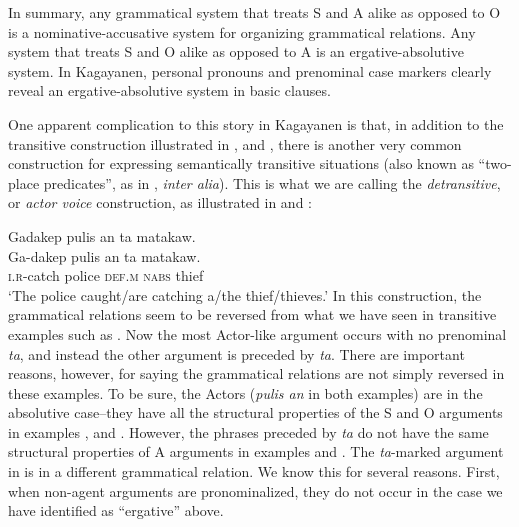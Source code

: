 In summary, any grammatical system that treats S and A alike as opposed to O is a nominative-accusative system for organizing grammatical relations. Any system that treats S and O alike as opposed to A is an ergative-absolutive system. In Kagayanen, personal pronouns and prenominal case markers clearly reveal an ergative-absolutive system in basic clauses.

One apparent complication to this story in Kagayanen is that, in addition to the transitive construction illustrated in ,  and , there is another very common construction for expressing semantically transitive situations (also known as “two-place predicates”, as in \citealt{polinsky2013b}, \textit{inter alia}). This is what we are calling the \textit{detransitive}, or \textit{actor voice} construction, as illustrated in  and :

\ea
\label{bkm:Ref482789597} \label{ex:gadakeppulisantamatakaw}
    Gadakep pulis an ta matakaw. \\\smallskip
\gll Ga-dakep pulis an ta matakaw. \\
    \textsc{i.r}-catch police \textsc{def.m} \textsc{nabs} thief \\
    \glt ‘The police caught/are catching a/the thief/thieves.’
\z
In this construction, the grammatical relations seem to be reversed from what we have seen in transitive examples such as . Now the most Actor-like argument occurs with no prenominal \textit{ta}, and instead the other argument is preceded by \textit{ta}. There are important reasons, however, for saying the grammatical relations are not simply reversed in these examples. To be sure, the Actors (\textit{pulis an} in both examples) are in the absolutive case--they have all the structural properties of the S and O arguments in examples , 
and . However, the phrases preceded by \textit{ta} do not have the same structural properties of A arguments in examples  and . The \textit{ta}-marked argument in  is in a different grammatical relation. We know this for several reasons. First, when non-agent arguments are pronominalized, they do not occur in the case we have identified as “ergative” above.

